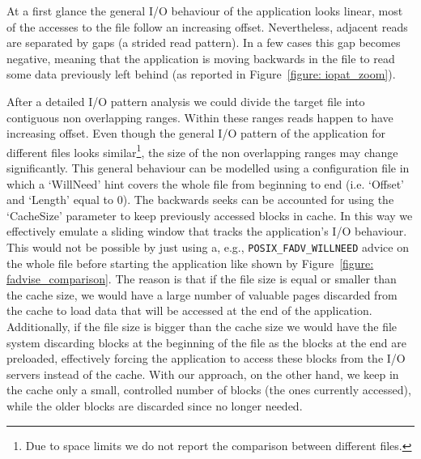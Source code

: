 At a first glance the general I/O behaviour of the application looks linear, most of the accesses to the file follow an increasing offset. Nevertheless, adjacent reads are separated by gaps (a strided read pattern). In a few cases this gap becomes negative, meaning that the application is moving backwards in the file to read some data previously left behind (as reported in Figure~\ref{figure: iopat_zoom}). %

After a detailed I/O pattern analysis we could divide the target file into contiguous non overlapping ranges. Within these ranges reads happen to have increasing offset. Even though the general I/O pattern of the application for different files looks similar\footnote{Due to space limits we do not report the comparison between different files.}, the size of the non overlapping ranges may change significantly. This general behaviour can be modelled using a configuration file in which a `WillNeed' hint covers the whole file from beginning to end (i.e. `Offset' and `Length' equal to 0). The backwards seeks can be accounted for using the `CacheSize' parameter to keep previously accessed blocks in cache. In this way we effectively emulate a sliding window that tracks the application's I/O behaviour. This would not be possible by just using a, e.g., \texttt{POSIX\_FADV\_WILLNEED} advice on the whole file before starting the application like shown by Figure~\ref{figure: fadvise_comparison}. The reason is that if the file size is equal or smaller than the cache size, we would have a large number of valuable pages discarded from the cache to load data that will be accessed at the end of the application. Additionally, if the file size is bigger than the cache size we would have the file system discarding blocks at the beginning of the file as the blocks at the end are preloaded, effectively forcing the application to access these blocks from the I/O servers instead of the cache. With our approach, on the other hand, we keep in the cache only a small, controlled number of blocks (the ones currently accessed), while the older blocks are discarded since no longer needed. 

